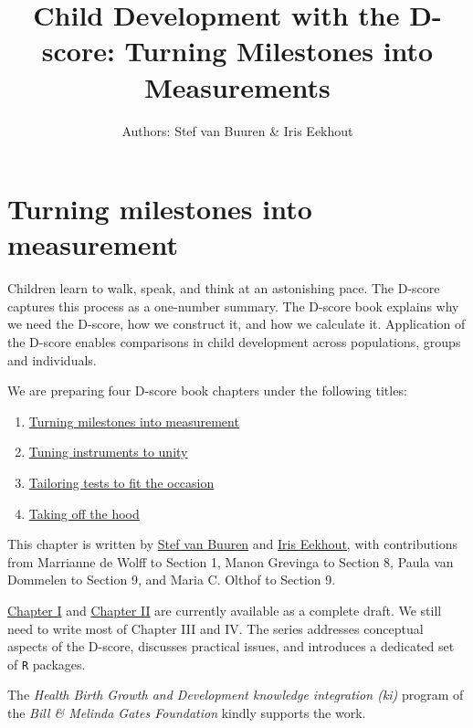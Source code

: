 \documentclass[
]{book}
\title{Child Development with the D-score: Turning Milestones into Measurements}
\author{Authors: Stef van Buuren \& Iris Eekhout}
\date{}
\providecommand{\tightlist}{%
  \setlength{\itemsep}{0pt}\setlength{\parskip}{0pt}}
\begin{document}
\maketitle

{
\setcounter{tocdepth}{1}
\tableofcontents
}
\hypertarget{turning-milestones-into-measurement}{%
\chapter*{Turning milestones into measurement}\label{turning-milestones-into-measurement}}

Children learn to walk, speak, and think at an astonishing pace. The D-score captures this process as a one-number summary. The D-score book explains why we need the D-score, how we construct it, and how we calculate it. Application of the D-score enables comparisons in child development across populations, groups and individuals.

We are preparing four D-score book chapters under the following titles:

\begin{enumerate}
\def\labelenumi{\Roman{enumi}.}
\tightlist
\item
  \href{https://d-score.org/dbook1}{Turning milestones into measurement}
\item
  \href{https://d-score.org/dbook2}{Tuning instruments to unity}
\item
  \href{https://stefvanbuuren.name/dbook3}{Tailoring tests to fit the occasion}
\item
  \href{https://stefvanbuuren.name/dbook4}{Taking off the hood}
\end{enumerate}

This chapter is written by \href{https://stefvanbuuren.name}{Stef van Buuren} and \href{https://www.iriseekhout.com}{Iris Eekhout}, with contributions from Marrianne de Wolff to Section 1, Manon Grevinga to Section 8, Paula van Dommelen to Section 9, and Maria C. Olthof to Section 9.

\href{https://d-score.org/dbook1}{Chapter I} and \href{https://d-score.org/dbook2}{Chapter II} are currently available as a complete draft. We still need to write most of Chapter III and IV. The series addresses conceptual aspects of the D-score, discusses practical issues, and introduces a dedicated set of \texttt{R} packages.

The \emph{Health Birth Growth and Development knowledge integration (ki)} program of the \emph{Bill \& Melinda Gates Foundation} kindly supports the work.
\end{document}
